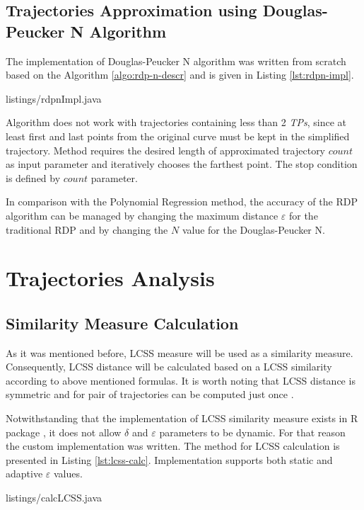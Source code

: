 \subsection{Trajectories Approximation using Douglas-Peucker N Algorithm}

The implementation of Douglas-Peucker N algorithm was written from scratch based on the Algorithm \ref{algo:rdp-n-descr} and is given in Listing \ref{lst:rdpn-impl}.

 {listings/rdpnImpl.java}

Algorithm does not work with trajectories containing less than 2 \textit{TPs}, since at least first and last points from the original curve must be kept in the simplified trajectory. Method requires the desired length of approximated trajectory $count$ as input parameter and iteratively chooses the farthest point. The stop condition is defined by $count$ parameter.

In comparison with the Polynomial Regression method, the accuracy of the RDP algorithm can be managed by changing the maximum distance $\varepsilon$ for the traditional RDP and by changing the $N$ value for the Douglas-Peucker N. 

\section{Trajectories Analysis}

\subsection{Similarity Measure Calculation}

As it was mentioned before, LCSS measure will be used as a similarity measure. Consequently, LCSS distance will be calculated based on a LCSS similarity according to above mentioned formulas. It is worth noting that LCSS distance is symmetric and for pair of trajectories can be computed just once \cite{inproceedings:28_lcss_dsmt}.

Notwithstanding that the implementation of LCSS similarity measure exists in R package \cite{online:r_lcss}, it does not allow $\delta$ and $\varepsilon$ parameters to be dynamic. For that reason the custom implementation was written. The method for LCSS calculation is presented in Listing \ref{lst:lcss-calc}. Implementation supports both static and adaptive $\varepsilon$ values.  

 {listings/calcLCSS.java}

